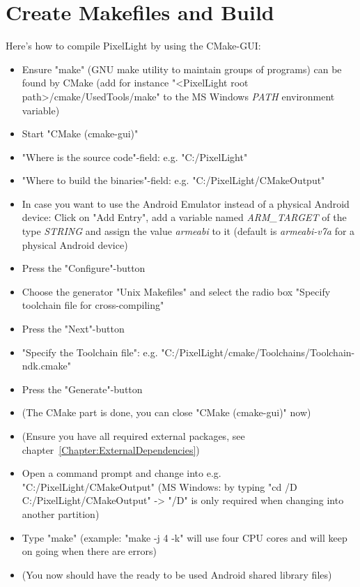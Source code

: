 \section{Create Makefiles and Build}
Here's how to compile PixelLight by using the CMake-GUI:
\begin{itemize}
\item{Ensure "make" (GNU make utility to maintain groups of programs) can be found by CMake (add for instance "\textless PixelLight root path\textgreater /cmake/UsedTools/make" to the MS Windows \emph{PATH} environment variable)}
\item{Start "CMake (cmake-gui)"}
\item{"Where is the source code"-field: e.g. "C:/PixelLight"}
\item{"Where to build the binaries"-field: e.g. "C:/PixelLight/CMakeOutput"}
\item{In case you want to use the Android Emulator instead of a physical Android device: Click on "Add Entry", add a variable named \emph{ARM\_TARGET} of the type \emph{STRING} and assign the value \emph{armeabi} to it (default is \emph{armeabi-v7a} for a physical Android device)}
\item{Press the "Configure"-button}
\item{Choose the generator "Unix Makefiles" and select the radio box "Specify toolchain file for cross-compiling"}
\item{Press the "Next"-button}
\item{"Specify the Toolchain file": e.g. "C:/PixelLight/cmake/Toolchains/Toolchain-ndk.cmake"}
\item{Press the "Generate"-button}
\item{(The CMake part is done, you can close "CMake (cmake-gui)" now)}
\item{(Ensure you have all required external packages, see chapter~\ref{Chapter:ExternalDependencies})}
\item{Open a command prompt and change into e.g. "C:/PixelLight/CMakeOutput" (MS Windows: by typing "cd /D C:/PixelLight/CMakeOutput" -> "/D" is only required when changing into another partition)}
\item{Type "make" (example: "make -j 4 -k" will use four CPU cores and will keep on going when there are errors)}
\item{(You now should have the ready to be used Android shared library files)}
\end{itemize}
